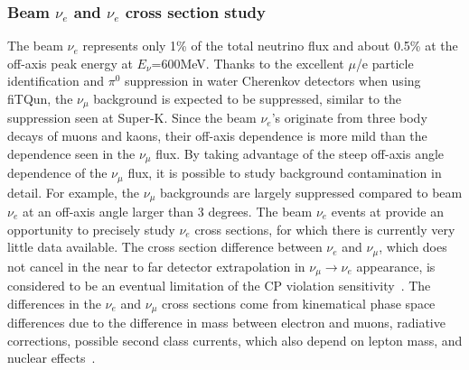 \subsubsection{Beam $\nu_e$ and $\nu_e$ cross section study}\label{sec:nuexsec}
The beam $\nu_e$ represents only 1\% of the total neutrino flux and about 0.5\% at the off-axis peak energy at $E_\nu$=600MeV. Thanks to the excellent $\mu$/e particle identification and $\pi^0$ suppression in water Cherenkov detectors when using fiTQun, the $\nu_\mu$ background is expected to be suppressed, similar to the suppression seen at Super-K. Since the beam $\nu_e$'s originate from three body decays of muons and kaons, their off-axis dependence is more mild than the dependence seen in the $\nu_\mu$ flux. By taking advantage of the steep off-axis angle dependence of the $\nu_\mu$ flux, it is possible to study background contamination in detail. For example, the $\nu_\mu$ backgrounds are largely suppressed compared to beam $\nu_e$ at an off-axis angle larger than 3 degrees. The beam $\nu_e$ events at \nuprismlite provide an opportunity to precisely study $\nu_e$ cross sections, for which there is currently very little data available. The cross section difference between $\nu_e$ and $\nu_\mu$, which does not cancel in the near to far detector extrapolation in $\nu_\mu \rightarrow \nu_e$ appearance, is considered to be an eventual limitation of the CP violation sensitivity~\cite{nuSTORM}. 
The differences in the $\nu_e$ and $\nu_\mu$ cross sections come from kinematical phase space differences due to the difference in mass between electron and muons, radiative corrections, possible second class currents, which also depend on lepton mass, and nuclear effects~\cite{nue-numu-cross-section}.


